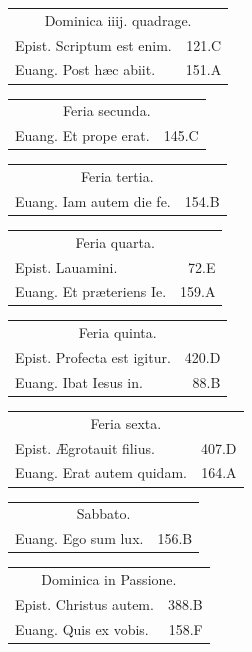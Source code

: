 \documentclass[a5paper,10pt]{book}
\def\ae{æ}
\def\AE{Æ}
\begin{document}
\begin{multicols}{2}
\begin{tabular}{l r}
\multicolumn{2}{c}{\color{red} Dominica iiij. quadrage.}\\
Epist. Scriptum est enim. & 121.C\\
Euang. Post h\ae c abiit. & 151.A\\
\end{tabular}
\begin{tabular}{l r}
\multicolumn{2}{c}{\color{red} Feria secunda.}\\
Euang. Et prope erat. & 145.C\\
\end{tabular}
\begin{tabular}{l r}
\multicolumn{2}{c}{\color{red} Feria tertia.}\\
Euang. Iam autem die fe. & 154.B\\
\end{tabular}
\begin{tabular}{l r}
\multicolumn{2}{c}{\color{red} Feria quarta.}\\
Epist. Lauamini. & 72.E\\
Euang. Et pr\ae teriens Ie. & 159.A\\
\end{tabular}
\begin{tabular}{l r}
\multicolumn{2}{c}{\color{red} Feria quinta.}\\
Epist. Profecta est igitur. & 420.D\\
Euang. Ibat Iesus in. & 88.B\\
\end{tabular}
\begin{tabular}{l r}
\multicolumn{2}{c}{\color{red} Feria sexta.}\\
Epist. \AE grotauit filius. & 407.D\\
Euang. Erat autem quidam. & 164.A\\
\end{tabular}
\begin{tabular}{l r}
\multicolumn{2}{c}{\color{red} Sabbato.}\\
Euang. Ego sum lux. & 156.B\\
\end{tabular}
\begin{tabular}{l r}
\multicolumn{2}{c}{\color{red} Dominica in Passione.}\\
Epist. Christus autem. & 388.B\\
Euang. Quis ex vobis. & 158.F\\
\end{tabular}
\begin{tabular}{l r}

\end{tabular}
\end{multicols}
\end{document}

